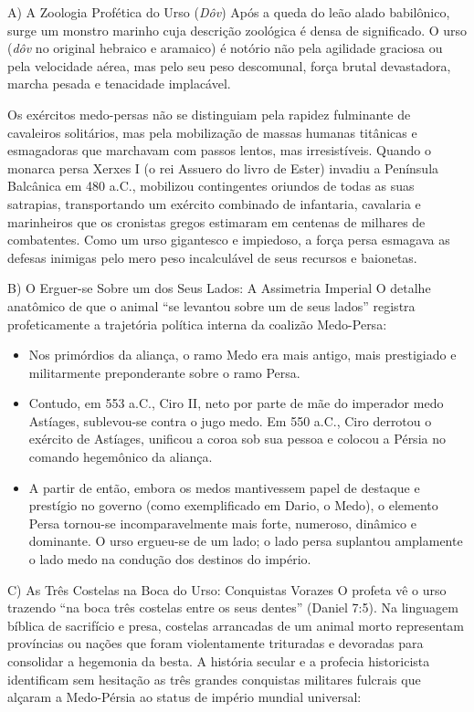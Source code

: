 A) A Zoologia Profética do Urso (\textit{Dôv})
Após a queda do leão alado babilônico, surge um monstro marinho cuja descrição zoológica é densa de significado. O urso (\textit{dôv} no original hebraico e aramaico) é notório não pela agilidade graciosa ou pela velocidade aérea, mas pelo seu peso descomunal, força brutal devastadora, marcha pesada e tenacidade implacável.

Os exércitos medo-persas não se distinguiam pela rapidez fulminante de cavaleiros solitários, mas pela mobilização de massas humanas titânicas e esmagadoras que marchavam com passos lentos, mas irresistíveis. Quando o monarca persa Xerxes I (o rei Assuero do livro de Ester) invadiu a Península Balcânica em 480 a.C., mobilizou contingentes oriundos de todas as suas satrapias, transportando um exército combinado de infantaria, cavalaria e marinheiros que os cronistas gregos estimaram em centenas de milhares de combatentes. Como um urso gigantesco e impiedoso, a força persa esmagava as defesas inimigas pelo mero peso incalculável de seus recursos e baionetas.

B) O Erguer-se Sobre um dos Seus Lados: A Assimetria Imperial
O detalhe anatômico de que o animal ``se levantou sobre um de seus lados'' registra profeticamente a trajetória política interna da coalizão Medo-Persa:
\begin{itemize}
  \item Nos primórdios da aliança, o ramo Medo era mais antigo, mais prestigiado e militarmente preponderante sobre o ramo Persa.
  \item Contudo, em 553 a.C., Ciro II, neto por parte de mãe do imperador medo Astíages, sublevou-se contra o jugo medo. Em 550 a.C., Ciro derrotou o exército de Astíages, unificou a coroa sob sua pessoa e colocou a Pérsia no comando hegemônico da aliança.
  \item A partir de então, embora os medos mantivessem papel de destaque e prestígio no governo (como exemplificado em Dario, o Medo), o elemento Persa tornou-se incomparavelmente mais forte, numeroso, dinâmico e dominante. O urso ergueu-se de um lado; o lado persa suplantou amplamente o lado medo na condução dos destinos do império.
\end{itemize}


C) As Três Costelas na Boca do Urso: Conquistas Vorazes
O profeta vê o urso trazendo ``na boca três costelas entre os seus dentes'' (Daniel 7:5). Na linguagem bíblica de sacrifício e presa, costelas arrancadas de um animal morto representam províncias ou nações que foram violentamente trituradas e devoradas para consolidar a hegemonia da besta. A história secular e a profecia historicista identificam sem hesitação as três grandes conquistas militares fulcrais que alçaram a Medo-Pérsia ao status de império mundial universal:

